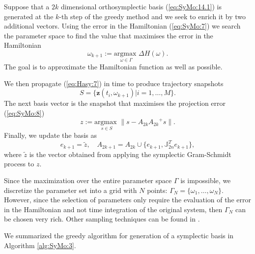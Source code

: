 Suppose that a $2k$ dimensional {\edit orthosymplectic basis (\ref{eq:SyMo:14.1})} is generated at the $k$-th step of the greedy method and we seek to enrich it by two additional vectors. Using the error in the Hamiltonian (\ref{eq:SyMo:7}) we search the parameter space to find the value that maximises the error in the Hamiltonian
\begin{equation} \label{eq:SyMo:14.5}
	\omega_{k+1} := \underset{\omega\in \Gamma}{\text{argmax }}\Delta H(\omega).
\end{equation}
The goal is to approximate the Hamiltonian function as well as possible. 

We then propagate (\ref{eq:Hasy:7}) in time to produce trajectory snapshots 
\begin{equation}
	S=\{ \mathbf z(t_i,\omega_{k+1}) | i = 1,\dots,M \}.
\end{equation} 
The next basis vector is the snapshot that maximises the projection error (\ref{eq:SyMo:8})
{\edit 
\begin{equation} \label{eq:SyMo:14.6}
	z := \underset{s\in S}{\text{argmax }} \| s - A_{2k}{A_{2k}}^+s \|.
\end{equation}
}
Finally, we update the basis as
{\edit
\begin{equation} \label{eq:SyMo:14.7}
	e_{k+1} = \tilde z, \quad A_{2k+1} = A_{2k}\cup \{ e_{k+1} , \mathbb J_{2n}^Te_{k+1} \},
\end{equation}
}
where $\tilde z$ is the vector obtained from applying the symplectic Gram-Schmidt process to $z$. 

Since the maximization over the entire parameter space $\Gamma$ is impossible, we discretize the parameter set into a grid with $N$ points: $\Gamma_N = \{ \omega_1,\dots,\omega_N\}$. However, since the selection of parameters only require the evaluation of the error in the Hamiltonian and not time integration of the original system, then $\Gamma_N$ can be chosen very rich. Other sampling techniques can be found in \cite{Quarteroni:2016wi}.

We summarized the greedy algorithm for generation of a symplectic basis in Algorithm \ref{alg:SyMo:3}.




